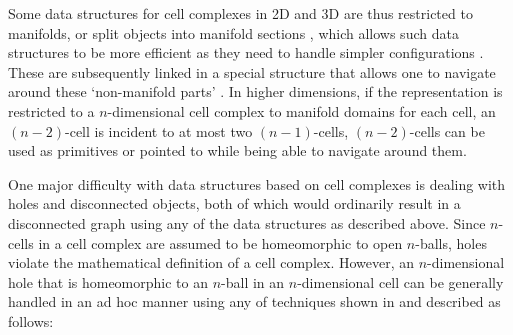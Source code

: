 Some data structures for cell complexes in 2D and 3D are thus restricted to manifolds, or split objects into manifold sections \citep{Pesco04,Lopes97}, which allows such data structures to be more efficient as they need to handle simpler configurations \citep{Aguila03}.
These are subsequently linked in a special structure that allows one to navigate around these `non-manifold parts' \citep{Weiler88,Gursoz90,Lee01}.
In higher dimensions, if the representation is restricted to a $n$-dimensional cell complex to manifold domains for each cell, an $(n-2)$-cell is incident to at most two $(n-1)$-cells, $(n-2)$-cells can be used as primitives or pointed to while being able to navigate around them.

One major difficulty with data structures based on cell complexes is dealing with holes and disconnected objects, both of which would ordinarily result in a disconnected graph using any of the data structures as described above.
Since $n$-cells in a cell complex are assumed to be homeomorphic to open $n$-balls, holes violate the mathematical definition of a cell complex.
However, an $n$-dimensional hole that is homeomorphic to an $n$-ball in an $n$-dimensional cell can be generally handled in an ad hoc manner using any of techniques shown in  and described as follows:
